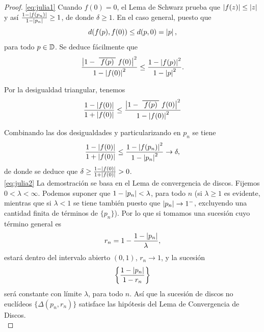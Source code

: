 \begin{proof}
    \eqref{eq:julia1} Cuando $f(0) = 0$, el Lema de Schwarz prueba que $\left\lvert f(z)\right\rvert \leq \left\lvert z\right\rvert$ y así $\frac{1-\left\lvert f(p_n)\right\rvert}{1-\left\lvert p_n\right\rvert} \geq 1$, de donde $\delta \geq 1$. En el caso general, puesto que
    \begin{equation*}
        d(f(p), f(0)) \leq d(p,0) = \left\lvert p\right\rvert,
    \end{equation*}
    para todo $p \in \mathbb{D}$. Se deduce fácilmente que
    \begin{equation*}
        \frac{\abs{1-\xbar{f(p)} f(0)}^2}{1-\abs{f(0)}^2} \leq \frac{1 - \abs{f(p)}^2}{1 - \abs{p}^2}.
    \end{equation*}

    Por la desigualdad triangular, tenemos
    \begin{equation*}
        \frac{1 - \abs{f(0)}}{1 + \abs{f(0)}} \leq \frac{\abs{1-\xbar{f(p)} f(0)}^2}{1-\abs{f(0)}^2}
    \end{equation*}

    Combinando las dos desigualdades y particularizando en $p_n$ se tiene
    \begin{equation*}
        \frac{1 - \left\lvert f(0)\right\rvert}{1 + \left\lvert f(0)\right\rvert} \leq \frac{1 - \left\lvert f(p_n)\right\rvert^2}{1 - \left\lvert p_n\right\rvert^2} \to \delta,
    \end{equation*}
    de donde se deduce que $\delta \geq \frac{1 - \left\lvert f(0)\right\rvert}{1 + \left\lvert f(0)\right\rvert} > 0$. \\

    \eqref{eq:julia2} La demostración se basa en el Lema de convergencia de discos. Fijemos $0 < \lambda < \infty$. Podemos suponer que $1 - \left\lvert p_n\right\rvert < \lambda$, para todo $n$ (si $\lambda \geq 1$ es evidente, mientras que si $\lambda < 1$ se tiene también puesto que $\left\lvert p_n\right\rvert \to 1^-$, excluyendo una cantidad finita de términos de $\{p_n\}$). Por lo que si tomamos una sucesión cuyo término general es
    \begin{equation*}
        r_n = 1 - \frac{1 - \left\lvert p_n\right\rvert}{\lambda},
    \end{equation*}
    estará dentro del intervalo abierto $(0,1)$, $r_n \to 1$, y la sucesión
    \begin{equation*}
        \left\{\frac{1 - \left\lvert p_n\right\rvert}{1 - r_n}\right\}
    \end{equation*}
    será constante con límite $\lambda$, para todo $n$. Así que la sucesión de discos no euclídeos $\{\Delta(p_n, r_n)\}$ satisface las hipótesis del Lema de Convergencia de Discos. \\


\end{proof}
